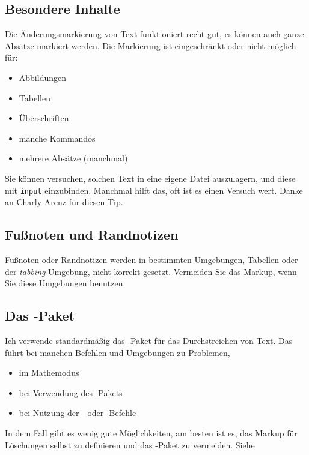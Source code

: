 \subsection{Besondere Inhalte}

Die Änderungsmarkierung von Text funktioniert recht gut, es können auch ganze Absätze markiert werden.
Die Markierung ist eingeschränkt oder nicht möglich für:

\begin{itemize}
	\item Abbildungen
	\item Tabellen
	\item Überschriften
	\item manche Kommandos
	\item mehrere Absätze (manchmal)
\end{itemize}

Sie können versuchen, solchen Text in eine eigene Datei auszulagern, und diese mit \texttt{input} einzubinden.
Manchmal hilft das, oft ist es einen Versuch wert.
Danke an Charly Arenz für diesen Tip.

\subsection{Fußnoten und Randnotizen}

Fußnoten oder Randnotizen werden in bestimmten Umgebungen, \zB Tabellen oder der \emph{tabbing}-Umgebung, nicht korrekt gesetzt.
Vermeiden Sie das Markup, wenn Sie diese Umgebungen benutzen.

\subsection{Das -Paket}

Ich verwende standardmäßig das -Paket für das Durchstreichen von Text.
Das führt bei manchen Befehlen und Umgebungen zu Problemen, \zB

\begin{itemize}
	\item im Mathemodus
	\item bei Verwendung des -Pakets
	\item bei Nutzung der - oder -Befehle
\end{itemize}

In dem Fall gibt es wenig gute Möglichkeiten, am besten ist es, das Markup für Löschungen selbst zu definieren und das -Paket zu vermeiden.
Siehe

